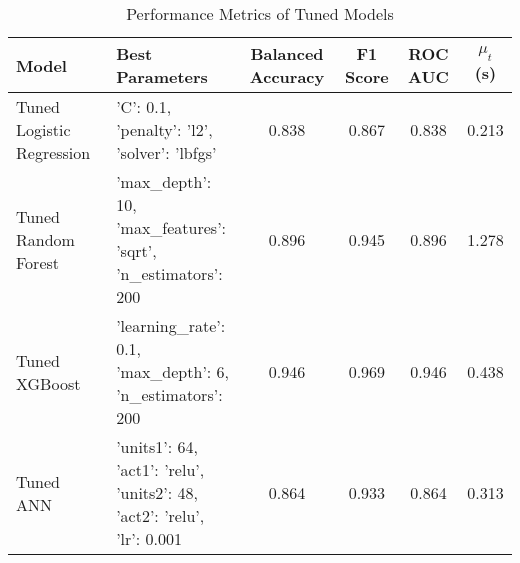 \begin{table}[h!]
\centering
\caption{Performance Metrics of Tuned Models}
\label{tab:model_performance}
\begin{tabular}{llcccc}
\toprule
\textbf{Model} & \textbf{Best Parameters} & \textbf{Balanced Accuracy} & \textbf{F1 Score} & \textbf{ROC AUC} & $\mu_t$ (s) \\
\midrule
Tuned Logistic Regression & {'C': 0.1,\\ 'penalty': 'l2',\\ 'solver': 'lbfgs'} & 0.838 & 0.867 & 0.838 & 0.213 \\
Tuned Random Forest & {'max\_depth': 10,\\ 'max\_features': 'sqrt',\\ 'n\_estimators': 200} & 0.896 & 0.945 & 0.896 & 1.278 \\
Tuned XGBoost & {'learning\_rate': 0.1,\\ 'max\_depth': 6,\\ 'n\_estimators': 200} & 0.946 & 0.969 & 0.946 & 0.438 \\
Tuned ANN & {'units1': 64,\\ 'act1': 'relu',\\ 'units2': 48,\\ 'act2': 'relu',\\ 'lr': 0.001} & 0.864 & 0.933 & 0.864 & 0.313 \\
\bottomrule
\end{tabular}
\end{table}
